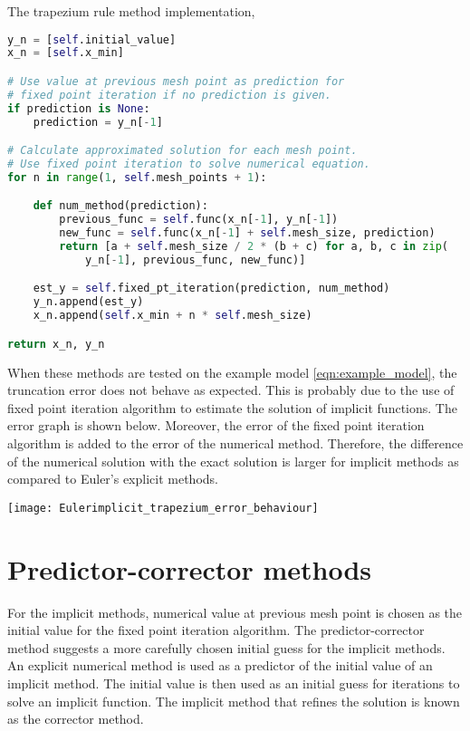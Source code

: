 The trapezium rule method implementation,
\begin{lstlisting}[language=Python]
y_n = [self.initial_value]
x_n = [self.x_min]

# Use value at previous mesh point as prediction for
# fixed point iteration if no prediction is given.
if prediction is None:
    prediction = y_n[-1]

# Calculate approximated solution for each mesh point.
# Use fixed point iteration to solve numerical equation.
for n in range(1, self.mesh_points + 1):

    def num_method(prediction):
        previous_func = self.func(x_n[-1], y_n[-1])
        new_func = self.func(x_n[-1] + self.mesh_size, prediction)
        return [a + self.mesh_size / 2 * (b + c) for a, b, c in zip(
            y_n[-1], previous_func, new_func)]

    est_y = self.fixed_pt_iteration(prediction, num_method)
    y_n.append(est_y)
    x_n.append(self.x_min + n * self.mesh_size)

return x_n, y_n
\end{lstlisting}

When these methods are tested on the example model \ref{eqn:example_model}, the truncation error does not behave as expected. This is probably due to the use of fixed point iteration algorithm to estimate the solution of implicit functions. The error graph is shown below. Moreover, the error of the fixed point iteration algorithm is added to the error of the numerical method. Therefore, the difference of the numerical solution with the exact solution is larger for implicit methods as compared to Euler's explicit methods.

\texttt{[image: Eulerimplicit\_trapezium\_error\_behaviour]}

\section{Predictor-corrector methods}
For the implicit methods, numerical value at previous mesh point is chosen as the initial value for the fixed point iteration algorithm. The predictor-corrector method suggests a more carefully chosen initial guess for the implicit methods. An explicit numerical method is used as a predictor of the initial value of an implicit method. The initial value is then used as an initial guess for iterations to solve an implicit function. The implicit method that refines the solution is known as the corrector method. 

